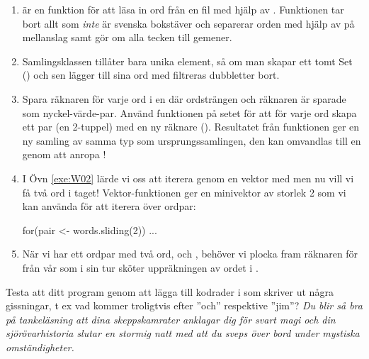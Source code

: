 \begin{enumerate}
\item {} är en funktion för att läsa in ord från en fil med hjälp av . Funktionen tar bort allt som {\em inte} är svenska bokstäver och separerar orden med hjälp av  på mellanslag samt gör om alla tecken till gemener. 

\item Samlingsklassen  tillåter bara unika element, så om man skapar ett tomt Set () och sen lägger till sina ord med \code{++}  filtreras dubbletter bort. 

\item Spara räknaren för varje ord i en  där ordsträngen och räknaren är sparade som nyckel-värde-par. Använd funktionen  på setet för att för varje ord  skapa ett par (en 2-tuppel) med en ny räknare (). Resultatet från funktionen  ger en ny samling av samma typ som ursprungssamlingen, den kan omvandlas till en genom att anropa !

\item I Övn \ref{exe:W02} lärde vi oss att iterera genom en vektor med  men nu vill vi få två ord i taget! Vektor-funktionen  ger en minivektor av storlek 2 som vi kan använda för att iterera över ordpar: 
\begin{Code} 
for(pair <- words.sliding(2)) { ... } 
\end{Code}

\item När vi har ett ordpar med två ord,  och , behöver vi plocka fram räknaren för  från vår  som i sin tur sköter uppräkningen av ordet  i . 

\end{enumerate}

\Subtask Testa att ditt program genom att lägga till kodrader i   som skriver ut några gissningar, t ex vad kommer troligtvis efter ''och'' respektive ''jim''? 
\newline
\newline
\noindent
\emph{Du blir så bra på tankeläsning att dina skeppskamrater anklagar dig för svart magi och din sjörövarhistoria slutar en stormig natt med att du sveps över bord under mystiska omständigheter.}


